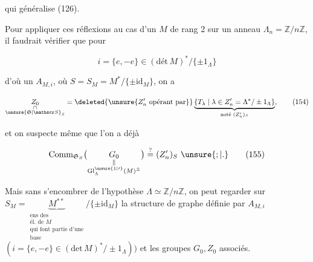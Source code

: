 
qui généralise (126).


Pour appliquer ces réflexions au cas d'un $M$  de rang 2 sur un anneau $\Lambda_n=\mathbb Z/n\mathbb Z$, il faudrait vérifier que pour

\[
 i=\{e,-e\}\in(\text{dét}\,M)^{*}/\{\pm1_\Lambda\}
\]

d'où un $A_{M,i}$,   où $S=S_M=M^{*}/\{\pm\mathrm{id}_M\}$, on a 

\[
 \underset{\substack{\cap\\ \unsure{\mathfrak S|\mathscr S}_S}}{Z_0}
 =\deleted{\unsure{Z'_n\ \text{opérant par}}}
 \underbrace{\{T_\lambda\mid\lambda\in{Z'_n}=\Lambda^*/\pm1_\Lambda\}}_{\text{noté }(Z'_n)_S},
 \tag*{(154)}
\]

et on suspecte même que l'on a déjà

\[
 \operatorname{Comm}_{\mathfrak S_S}
 \bigl(\underset{\substack{\Vert\\{\mathrm{Gl}}^{\unsure{1|\prime}}_\Lambda(M)^\pm}}{G_0}\bigr)
 \overset{?}{=}(Z'_n)_S\ \unsure{;|.}
 \tag*{(155)}
\]

Mais sans s'encombrer de l'hypothèse $\Lambda\simeq\mathbb Z/n\mathbb Z$, on peut regarder sur $S_M=\underbrace{M^{**}}_{\substack{\text{ens des}\\\text{él. de }M\\\text{qui font partie d'une}\\\text{base}}}/\{\pm\mathrm{id}_M\}$ la structure de graphe définie par $A_{M,i}$ $(i=\{e,-e\}\in(\text{det}\,M)^*/\pm1_\Lambda))$ et les groupes $G_0,Z_0$ associés.

